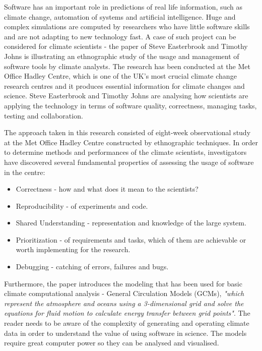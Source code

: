 Software has an important role in predictions of real life information, such as climate change, automation of systems and artificial intelligence. \cite{easterbrook2009engineering}\cite{chasmSoftware} Huge and complex simulations are computed by researchers who have little software skills and are not adapting to new technology fast. A case of such project can be considered for climate scientists - the paper of Steve Easterbrook and Timothy Johns \cite{easterbrook2009engineering} is illustrating an ethnographic study of the usage and management of software tools by climate analysts. The research has been conducted at the Met Office Hadley Centre, which 
is one of the UK's most crucial climate change research centres and it produces essential information for climate changes and science. \cite{metOffice} Steve Easterbrook and Timothy Johns \cite{easterbrook2009engineering} are analysing how scientists are applying the technology in terms of software quality, correctness, managing tasks, testing and collaboration. 

The approach taken in this research consisted of eight-week observational study at the
Met Office Hadley Centre constructed by ethnographic techniques. In order to determine methods and performances of the climate scientists, investigators have discovered several fundamental properties of assessing the usage of software in the centre:\cite{easterbrook2009engineering}

\begin{itemize}
\item Correctness - how and what does it mean to the scientists? 
\item Reproducibility - of experiments and code. 
\item Shared Understanding - representation and knowledge of the large system. 
\item Prioritization - of requirements and tasks, which of them are achievable or worth implementing for the research. 
\item Debugging - catching of errors, failures and bugs.
\end{itemize}

Furthermore, the paper introduces the modeling that has been used for basic climate computational analysis - General Circulation Models (GCMs), \textit{"which represent the atmosphere and oceans using a 3-dimensional grid and solve the equations for fluid motion to calculate energy transfer between grid points"}. \cite{easterbrook2009engineering} The reader needs to be aware of the complexity of generating and operating climate data in order to understand the value of using software in science. The models require great computer power so they can be analysed and visualised.

